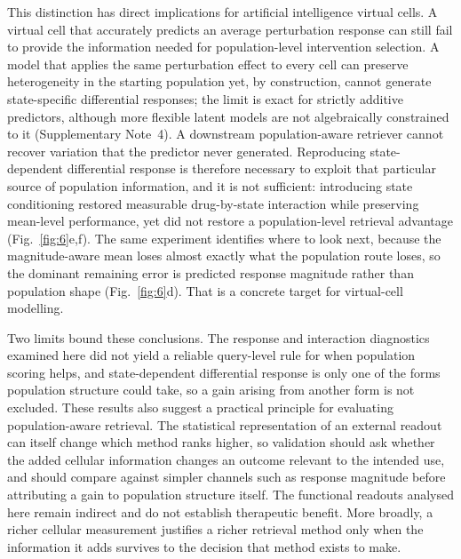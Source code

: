 \documentclass[11pt,letterpaper]{article}
\begin{document}
This distinction has direct implications for artificial intelligence virtual cells\cite{AIVirtualCell,VirtualCellChallenge}. A virtual cell that accurately predicts an average perturbation response can still fail to provide the information needed for population-level intervention selection. A model that applies the same perturbation effect to every cell can preserve heterogeneity in the starting population yet, by construction, cannot generate state-specific differential responses; the limit is exact for strictly additive predictors, although more flexible latent models are not algebraically constrained to it (Supplementary Note~4). A downstream population-aware retriever cannot recover variation that the predictor never generated. Reproducing state-dependent differential response is therefore necessary to exploit that particular source of population information, and it is not sufficient: introducing state conditioning restored measurable drug-by-state interaction while preserving mean-level performance, yet did not restore a population-level retrieval advantage (Fig.~\ref{fig:6}e,f). The same experiment identifies where to look next, because the magnitude-aware mean loses almost exactly what the population route loses, so the dominant remaining error is predicted response magnitude rather than population shape (Fig.~\ref{fig:6}d). That is a concrete target for virtual-cell modelling.

Two limits bound these conclusions. The response and interaction diagnostics examined here did not yield a reliable query-level rule for when population scoring helps, and state-dependent differential response is only one of the forms population structure could take, so a gain arising from another form is not excluded. These results also suggest a practical principle for evaluating population-aware retrieval. The statistical representation of an external readout can itself change which method ranks higher\cite{ref17,MetricGaming}, so validation should ask whether the added cellular information changes an outcome relevant to the intended use, and should compare against simpler channels such as response magnitude\cite{ref13} before attributing a gain to population structure itself. The functional readouts analysed here remain indirect and do not establish therapeutic benefit. More broadly, a richer cellular measurement justifies a richer retrieval method only when the information it adds survives to the decision that method exists to make.


\end{document}

